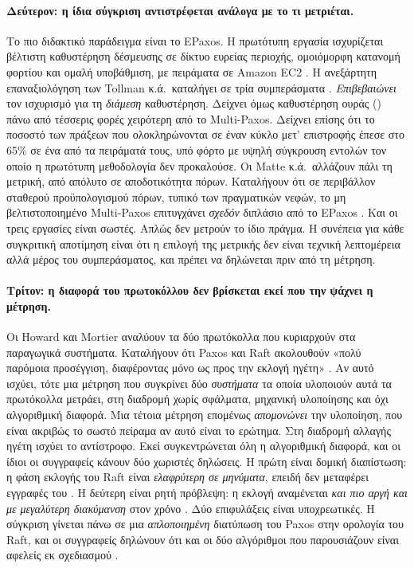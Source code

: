 \paragraph{Δεύτερον: η ίδια σύγκριση αντιστρέφεται ανάλογα με το τι
μετριέται.}
Το πιο διδακτικό παράδειγμα είναι το EPaxos. Η πρωτότυπη εργασία
ισχυρίζεται βέλτιστη καθυστέρηση δέσμευσης σε δίκτυο ευρείας περιοχής,
ομοιόμορφη κατανομή φορτίου και ομαλή υποβάθμιση, με πειράματα σε Amazon
EC2 \cite{moraru2013epaxos}. Η ανεξάρτητη επαναξιολόγηση των Tollman
κ.ά.\ καταλήγει σε τρία συμπεράσματα \cite{tollman2021epaxosrevisited}.
\emph{Επιβεβαιώνει} τον ισχυρισμό για τη \emph{διάμεση} καθυστέρηση.
Δείχνει όμως καθυστέρηση ουράς () πάνω από τέσσερις
φορές χειρότερη από το Multi-Paxos. Δείχνει επίσης ότι το ποσοστό των
πράξεων που ολοκληρώνονται σε έναν κύκλο μετ' επιστροφής έπεσε στο 65\%
σε ένα από τα πειράματά τους, υπό φόρτο με υψηλή σύγκρουση εντολών τον
οποίο η πρωτότυπη μεθοδολογία δεν προκαλούσε. Οι Matte κ.ά.\ αλλάζουν
πάλι τη μετρική, από απόλυτο  σε αποδοτικότητα πόρων.
Καταλήγουν ότι σε περιβάλλον σταθερού προϋπολογισμού πόρων, τυπικό των
πραγματικών νεφών, το μη βελτιστοποιημένο Multi-Paxos επιτυγχάνει
\emph{σχεδόν} διπλάσιο  από το EPaxos
\cite{matte2021wasteful}. Και οι τρεις εργασίες είναι σωστές. Απλώς δεν
μετρούν το ίδιο πράγμα. Η συνέπεια για κάθε συγκριτική αποτίμηση είναι
ότι η επιλογή της μετρικής δεν είναι τεχνική λεπτομέρεια αλλά μέρος του
συμπεράσματος, και πρέπει να δηλώνεται πριν από τη μέτρηση.

\paragraph{Τρίτον: η διαφορά του πρωτοκόλλου δεν βρίσκεται εκεί που την
ψάχνει η μέτρηση.}
Οι Howard και Mortier αναλύουν τα δύο πρωτόκολλα που κυριαρχούν στα
παραγωγικά συστήματα. Καταλήγουν ότι Paxos και Raft ακολουθούν «πολύ
παρόμοια προσέγγιση, διαφέροντας μόνο ως προς την εκλογή ηγέτη»
\cite{howard2020paxosraft}. Αν αυτό ισχύει, τότε μια μέτρηση που
συγκρίνει δύο \emph{συστήματα} τα οποία υλοποιούν αυτά τα πρωτόκολλα
μετράει, στη διαδρομή χωρίς σφάλματα, μηχανική υλοποίησης και όχι
αλγοριθμική διαφορά. Μια τέτοια μέτρηση επομένως \emph{απομονώνει} την
υλοποίηση, που είναι ακριβώς το σωστό πείραμα αν αυτό είναι το ερώτημα.
Στη διαδρομή αλλαγής ηγέτη ισχύει το αντίστροφο. Εκεί συγκεντρώνεται όλη
η αλγοριθμική διαφορά, και οι ίδιοι οι συγγραφείς κάνουν δύο χωριστές
δηλώσεις. Η πρώτη είναι δομική διαπίστωση: η φάση εκλογής του Raft είναι
\emph{ελαφρύτερη σε μηνύματα}, επειδή δεν μεταφέρει εγγραφές του
. Η δεύτερη είναι ρητή πρόβλεψη: η εκλογή αναμένεται \emph{και
πιο αργή και με μεγαλύτερη διακύμανση} στον χρόνο
\cite{howard2020paxosraft}. Δύο επιφυλάξεις είναι υποχρεωτικές. Η
σύγκριση γίνεται πάνω σε μια \emph{απλοποιημένη} διατύπωση του Paxos στην
ορολογία του Raft, και οι συγγραφείς δηλώνουν ότι και οι δύο αλγόριθμοι
που παρουσιάζουν είναι αφελείς εκ σχεδιασμού \cite{howard2020paxosraft}.


